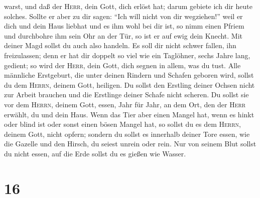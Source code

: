 warst, und daß der \textsc{Herr}, dein Gott, dich erlöst hat; darum
gebiete ich dir heute solches.  Sollte er aber zu dir
sagen: ``Ich will nicht von dir wegziehen!'' weil er dich und dein Haus
liebhat und es ihm wohl bei dir ist,  so nimm einen
Pfriem und durchbohre ihm sein Ohr an der Tür, so ist er auf ewig dein
Knecht. Mit deiner Magd sollst du auch also handeln.  Es
soll dir nicht schwer fallen, ihn freizulassen; denn er hat dir doppelt
so viel wie ein Taglöhner, sechs Jahre lang, gedient; so wird der
\textsc{Herr}, dein Gott, dich segnen in allem, was du tust.
 Alle männliche Erstgeburt, die unter deinen Rindern und
Schafen geboren wird, sollst du dem \textsc{Herrn}, deinem Gott,
heiligen. Du sollst den Erstling deiner Ochsen nicht zur Arbeit brauchen
und die Erstlinge deiner Schafe nicht scheren.  Du sollst
sie vor dem \textsc{Herrn}, deinem Gott, essen, Jahr für Jahr, an dem
Ort, den der \textsc{Herr} erwählt, du und dein Haus. 
Wenn das Tier aber einen Mangel hat, wenn es hinkt oder blind ist oder
sonst einen bösen Mangel hat, so sollst du es dem \textsc{Herrn}, deinem
Gott, nicht opfern;  sondern du sollst es innerhalb
deiner Tore essen, wie die Gazelle und den Hirsch, du seiest unrein oder
rein.  Nur von seinem Blut sollst du nicht essen, auf die
Erde sollst du es gießen wie Wasser.

\hypertarget{section-15}{%
\section{16}\label{section-15}}

